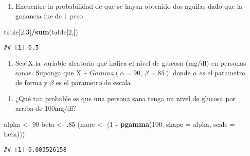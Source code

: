 \documentclass[
]{article}
\newenvironment{Shaded}{\begin{snugshade}}{\end{snugshade}}
\newcommand{\AttributeTok}[1]{\textcolor[rgb]{0.13,0.29,0.53}{#1}}
\newcommand{\DecValTok}[1]{\textcolor[rgb]{0.00,0.00,0.81}{#1}}
\newcommand{\FunctionTok}[1]{\textcolor[rgb]{0.13,0.29,0.53}{\textbf{#1}}}
\newcommand{\NormalTok}[1]{#1}
\newcommand{\OtherTok}[1]{\textcolor[rgb]{0.56,0.35,0.01}{#1}}
\newcommand{\SpecialCharTok}[1]{\textcolor[rgb]{0.81,0.36,0.00}{\textbf{#1}}}
\providecommand{\tightlist}{%
  \setlength{\itemsep}{0pt}\setlength{\parskip}{0pt}}
\begin{document}
\begin{enumerate}
\def\labelenumi{\alph{enumi})}
\setcounter{enumi}{3}
\tightlist
\item
  Encuentre la probabilidad de que se hayan obtenido dos aguilas dado
  que la ganancia fue de 1 peso
\end{enumerate}

\begin{Shaded}
\begin{Highlighting}[]
\NormalTok{table[}\DecValTok{2}\NormalTok{,}\DecValTok{3}\NormalTok{]}\SpecialCharTok{/}\FunctionTok{sum}\NormalTok{(table[}\DecValTok{2}\NormalTok{,])}
\end{Highlighting}
\end{Shaded}

\begin{verbatim}
## [1] 0.5
\end{verbatim}

\begin{enumerate}
\def\labelenumi{\arabic{enumi}.}
\setcounter{enumi}{4}
\tightlist
\item
  Sea X la variable aleatoria que indica el nivel de glucosa (mg/dl) en
  personas sanas. Suponga que X \textasciitilde{}
  \(Gamma(\alpha = 90, ~\beta = 85)\) donde \(\alpha\) es el parametro
  de forma y \(\beta\) es el parametro de escala
\end{enumerate}

\begin{enumerate}
\def\labelenumi{\alph{enumi})}
\tightlist
\item
  ¿Qué tan probable es que una persona sana tenga un nivel de glucosa
  por arriba de 100mg/dl?
\end{enumerate}

\begin{Shaded}
\begin{Highlighting}[]
\NormalTok{alpha }\OtherTok{\textless{}{-}} \DecValTok{90}
\NormalTok{beta }\OtherTok{\textless{}{-}}\NormalTok{ .}\DecValTok{85}
\NormalTok{(more }\OtherTok{\textless{}{-}}\NormalTok{ (}\DecValTok{1} \SpecialCharTok{{-}} \FunctionTok{pgamma}\NormalTok{(}\DecValTok{100}\NormalTok{, }\AttributeTok{shape =}\NormalTok{ alpha, }\AttributeTok{scale =}\NormalTok{ beta)))}
\end{Highlighting}
\end{Shaded}

\begin{verbatim}
## [1] 0.003526158
\end{verbatim}
\end{document}

